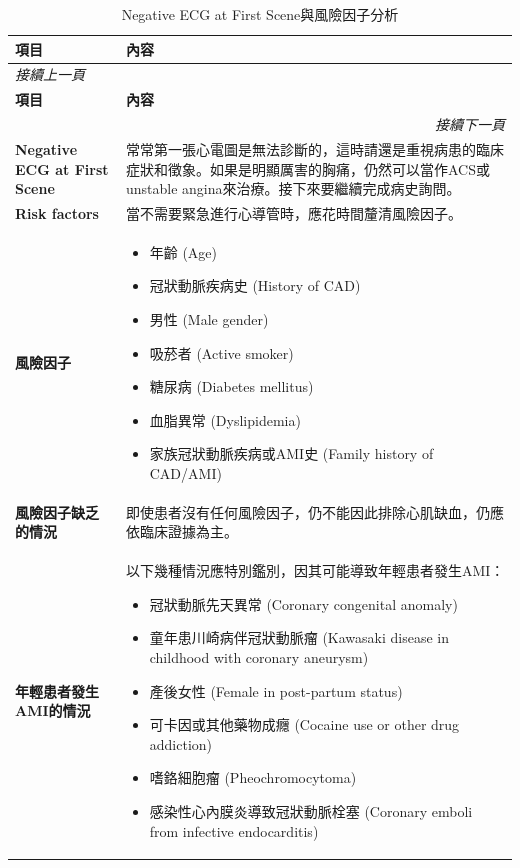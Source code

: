 \documentclass[fleqn,10pt,
paperheight=16cm, paperwidth=12cm,
includehead,%
nomarginpar,%
textwidth=10cm,%
headheight=25pt,%
]{wlscirep}
\begin{document}
\begin{longtable}{p{4cm} p{9cm}}
\caption{Negative ECG at First Scene與風險因子分析}\\
\hline
\textbf{項目} & \textbf{內容} \\
\hline
\endfirsthead
\multicolumn{2}{l}{\textit{接續上一頁}} \\
\hline
\textbf{項目} & \textbf{內容} \\
\hline
\endhead
\hline \multicolumn{2}{r}{\textit{接續下一頁}} \\
\endfoot
\endlastfoot

\textbf{Negative ECG at First Scene} & 
常常第一張心電圖是無法診斷的，這時請還是重視病患的臨床症狀和徵象。如果是明顯厲害的胸痛，仍然可以當作ACS或unstable angina來治療。接下來要繼續完成病史詢問。 \\ \hline

\textbf{Risk factors} & 
當不需要緊急進行心導管時，應花時間釐清風險因子。\\ \hline

\textbf{風險因子} & 
\begin{itemize}
    \item 年齡 (Age)
    \item 冠狀動脈疾病史 (History of CAD)
    \item 男性 (Male gender)
    \item 吸菸者 (Active smoker)
    \item 糖尿病 (Diabetes mellitus)
    \item 血脂異常 (Dyslipidemia)
    \item 家族冠狀動脈疾病或AMI史 (Family history of CAD/AMI)
\end{itemize} \\ \hline

\textbf{風險因子缺乏的情況} & 
即使患者沒有任何風險因子，仍不能因此排除心肌缺血，仍應依臨床證據為主。\\ \hline

\textbf{年輕患者發生AMI的情況} & 
以下幾種情況應特別鑑別，因其可能導致年輕患者發生AMI：
\begin{itemize}
    \item 冠狀動脈先天異常 (Coronary congenital anomaly)
    \item 童年患川崎病伴冠狀動脈瘤 (Kawasaki disease in childhood with coronary aneurysm)
    \item 產後女性 (Female in post-partum status)
    \item 可卡因或其他藥物成癮 (Cocaine use or other drug addiction)
    \item 嗜鉻細胞瘤 (Pheochromocytoma)
    \item 感染性心內膜炎導致冠狀動脈栓塞 (Coronary emboli from infective endocarditis)
\end{itemize} \\

\hline
\end{longtable}
\end{document}
